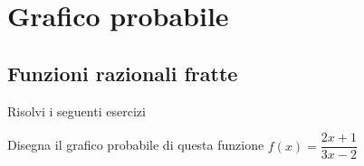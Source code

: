 \chapter{Grafico probabile}
\section{Funzioni razionali fratte}
Risolvi i seguenti esercizi

%	
%	
%	
%		
%		
%		
%		
%		
%		
\begin{exercise}[no solution]
Disegna il grafico probabile di questa funzione $f(x)= \dfrac{2x+1}{3x-2}$
\end{exercise}

